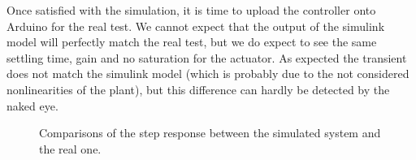 Once satisfied with the simulation, it is time to upload the controller onto Arduino for the real test. We cannot expect that the output of the simulink model will perfectly match the real test, but we do expect to see the same settling time, gain and no saturation for the actuator. As expected the transient does not match the simulink model (which is probably due to the not considered nonlinearities of the plant), but this difference can hardly be detected by the naked eye. 



 \begin{figure}[h]
  \centering
  \hfill
\caption{Comparisons of the step response between the simulated system and the real one.}
\end{figure}
